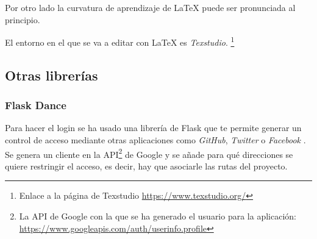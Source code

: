 Por otro lado la curvatura de aprendizaje de \LaTeX{} puede ser pronunciada al principio.

El entorno en el que se va a editar con \LaTeX{} es \textit{Texstudio}. \footnote{Enlace a la página de Texstudio \url{https://www.texstudio.org/}}

\subsection{Otras librerías}

\subsubsection{Flask Dance}
Para hacer el login se ha usado una librería de Flask que te permite generar un control de acceso mediante otras aplicaciones como \textit{GitHub}, \textit{Twitter} o \textit{Facebook} \cite{dance}.
Se genera un cliente en la API\footnote{La API de Google con la que se ha generado el usuario para la aplicación: \url{https://www.googleapis.com/auth/userinfo.profile}} de Google y se añade para qué direcciones se quiere restringir el acceso, es decir, hay que asociarle las rutas del proyecto.




